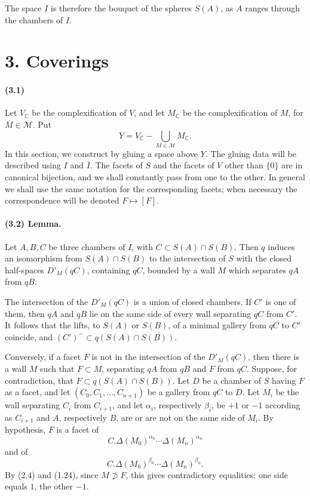 \documentclass[10pt]{article}
\newcommand{\C}{\mathbb C}
\begin{document}
The space \(I\) is therefore the bouquet of the spheres \(S(A)\), as \(A\) ranges through the chambers of \(I\).

\section*{3. Coverings}

\paragraph{(3.1)} Let \(V_\C\) be the complexification of \(V\), and let \(M_\C\) be the complexification of \(M\), for \(M\in\mathcal M\). Put
\[
Y=V_\C-\bigcup_{M\in\mathcal M}M_\C.
\]
In this section, we construct by gluing a space above \(Y\). The gluing data will be described using \(I\) and \(\overline I\). The facets of \(S\) and the facets of \(V\) other than \(\{0\}\) are in canonical bijection, and we shall constantly pass from one to the other. In general we shall use the same notation for the corresponding facets; when necessary the correspondence will be denoted \(F\mapsto [F]\).

\paragraph{(3.2) Lemma.} Let \(A,B,C\) be three chambers of \(I\), with \(C\subset S(A)\cap S(B)\). Then \(q\) induces an isomorphism from \(S(A)\cap S(B)\) to the intersection of \(S\) with the closed half-spaces \(D'_M(qC)\), containing \(qC\), bounded by a wall \(M\) which separates \(qA\) from \(qB\).

The intersection of the \(D'_M(qC)\) is a union of closed chambers. If \(C'\) is one of them, then \(qA\) and \(qB\) lie on the same side of every wall separating \(qC\) from \(C'\). It follows that the lifts, to \(S(A)\) or \(S(B)\), of a minimal gallery from \(qC\) to \(C'\) coincide, and \((C')^{-}\subset q(S(A)\cap S(B))\).

Conversely, if a facet \(F\) is not in the intersection of the \(D'_M(qC)\), then there is a wall \(M\) such that \(F\subset M\), separating \(qA\) from \(qB\) and \(F\) from \(qC\). Suppose, for contradiction, that \(F\subset q(S(A)\cap S(B))\). Let \(D\) be a chamber of \(S\) having \(F\) as a facet, and let \((C_0,C_1,\ldots,C_{n+1})\) be a gallery from \(qC\) to \(D\). Let \(M_i\) be the wall separating \(C_i\) from \(C_{i+1}\), and let \(\alpha_i\), respectively \(\beta_i\), be \(+1\) or \(-1\) according as \(C_{i+1}\) and \(A\), respectively \(B\), are or are not on the same side of \(M_i\). By hypothesis, \(F\) is a facet of
\[
C.\Delta(M_0)^{\alpha_0}\cdots \Delta(M_n)^{\alpha_n}
\]
and of
\[
C.\Delta(M_0)^{\beta_0}\cdots \Delta(M_n)^{\beta_n}.
\]
By (2.4) and (1.24), since \(M\not\supset F\), this gives contradictory equalities: one side equals \(1\), the other \(-1\).
\end{document}
